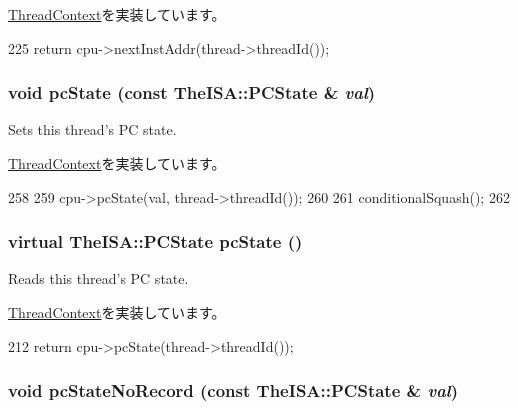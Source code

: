 \hyperlink{classThreadContext_a01377ccfda419abf5f6ff7730c9eaac9}{ThreadContext}を実装しています。


\begin{DoxyCode}
225     { return cpu->nextInstAddr(thread->threadId()); }
\end{DoxyCode}
\hypertarget{classO3ThreadContext_a5e9cfc754c9ef9b7db875ce89871944e}{
\subsubsection[{pcState}]{\setlength{\rightskip}{0pt plus 5cm}void pcState (const TheISA::PCState \& {\em val})}}
\label{classO3ThreadContext_a5e9cfc754c9ef9b7db875ce89871944e}
Sets this thread's PC state. 

\hyperlink{classThreadContext_a8f9949be84d3a2db4137f9e49ce32952}{ThreadContext}を実装しています。


\begin{DoxyCode}
258 {
259     cpu->pcState(val, thread->threadId());
260 
261     conditionalSquash();
262 }
\end{DoxyCode}
\hypertarget{classO3ThreadContext_a0af876e2694c08671975415a22764439}{
\subsubsection[{pcState}]{\setlength{\rightskip}{0pt plus 5cm}virtual TheISA::PCState pcState ()}}
\label{classO3ThreadContext_a0af876e2694c08671975415a22764439}
Reads this thread's PC state. 

\hyperlink{classThreadContext_a1aaca26c0732d2191edbde1477d7ec13}{ThreadContext}を実装しています。


\begin{DoxyCode}
212     { return cpu->pcState(thread->threadId()); }
\end{DoxyCode}
\hypertarget{classO3ThreadContext_a6005386aeeaecb35499c3199fb47ba2f}{
\subsubsection[{pcStateNoRecord}]{\setlength{\rightskip}{0pt plus 5cm}void pcStateNoRecord (const TheISA::PCState \& {\em val})}}
\label{classO3ThreadContext_a6005386aeeaecb35499c3199fb47ba2f}


